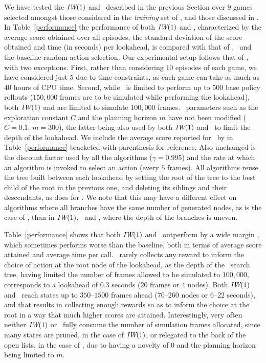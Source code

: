 We have tested the ${\textit{IW}}(1)$ and \BFS~described in the previous Section
over $9$ games selected amongst those considered in the \emph{training} set
of \cite{bellemare:jair2013}, and those discussed in \cite{deep-mind-atari}. 
In Table~\ref{performance} the performance of both ${\textit{IW}}(1)$ 
and \BFS, characterized by the average score obtained over all episodes, the standard deviation
of the score obtained and time (in seconds) per lookahead, is compared with that of \UCT, 
\BRFS~and the baseline random action selection. Our experimental 
setup  follows that of \cite{bellemare:jair2013}, with two exceptions. First, rather than
considering $10$ episodes of each game, we have considered just $5$
due to time constraints, as each game can take as much as $40$ hours of 
CPU time. Second, while \UCT~is limited to perform up to $500$ base policy rollouts ($150,000$ frames
are to be simulated while performing the lookahead), both ${\textit{IW}}(1)$ and \BFS are limited to
simulate $100,000$ frames. \UCT~parameters such as the exploration constant $C$ and
the planning horizon $m$ have not been modified ($C=0.1$, $m=300$), the latter being also
used by both ${\textit{IW}}(1)$ and \BFS~to limit the depth of the lookahead. We include
the average score reported for \UCT~by \cite{bellemare:jair2013} in Table~\ref{performance}
bracketed with parenthesis for reference. Also unchanged is the discount factor
used by all the algorithms ($\gamma=0.995$) and the rate at which an algorithm is
invoked to select an action (every $5$ frames). All algorithms reuse the tree built between each 
lookahead by setting the root of the tree to the best child of the root in the previous one,
and deleting its siblings and their descendants, as \cite{bellemare:jair2013} does for \UCT. We note that 
this may have a different effect on algorithms where all branches have the same number of
generated nodes, as is the case of \BRFS, than in ${\textit{IW}}(1)$, \BFS~and \UCT, where the depth of
the branches is uneven.

Table~\ref{performance} shows that both ${\textit{IW}}(1)$ and \BFS~outperform by a wide margin 
\BRFS, which sometimes performs worse than the baseline, both in terms of average score attained and 
average time per call. \BRFS~rarely collects any reward to inform the choice of action at
the root node of the lookahead, as the depth of the \BRFS~search tree, having limited the number of
frames allowed to be simulated to $100,000$, corresponds to a lookahead of $0.3$ seconds ($20$ 
frames or $4$ nodes). Both ${\textit{IW}}(1)$ and \BFS~reach states up to $350$--$1500$ frames ahead 
($70$--$260$ nodes or $6$--$22$ seconds), and that results in collecting enough rewards so as to
inform the choice at the root in a way that much higher scores are attained. Interestingly, very often
neither ${\textit{IW}}(1)$ or \BFS~fully consume the number of simulation frames allocated, since many
states are pruned, in the case of ${\textit{IW}}(1)$, or relegated to the back of the open lists, in the 
case of \BFS, due to having a novelty of $0$ and the planning horizon being limited to $m$. 

